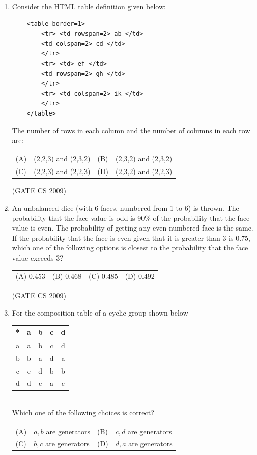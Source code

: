 \documentclass[a4paper, 11pt]{article}
\begin{document}
\begin{enumerate}
    \item Consider the HTML table definition given below:
    \begin{lstlisting}
    <table border=1>
        <tr> <td rowspan=2> ab </td>
        <td colspan=2> cd </td>
        </tr>
        <tr> <td> ef </td>
        <td rowspan=2> gh </td>
        </tr>
        <tr> <td colspan=2> ik </td>
        </tr>
    </table>
    \end{lstlisting}
    The number of rows in each column and the number of columns in each row are:\\
    \begin{tabularx}{\textwidth}{@{}lX lX@{}}
    (A) & (2,2,3) and (2,3,2)  & (B) & (2,3,2) and (2,3,2) \\
    (C) & (2,2,3) and (2,2,3) & (D) & (2,3,2) and (2,2,3)
    \end{tabularx}    

    \hfill (GATE CS 2009)

    \item An unbalanced dice (with 6 faces, numbered from 1 to 6) is thrown. The probability that the face value is odd is 90\% of the probability that the face value is even. The probability of getting any even numbered face is the same.\\
    If the probability that the face is even given that it is greater than 3 is 0.75, which one of the following options is closest to the probability that the face value exceeds 3?\\
    \begin{tabularx}{\textwidth}{@{}XXXX@{}}
    (A) 0.453 & (B) 0.468 & (C) 0.485 & (D) 0.492
    \end{tabularx}

    \hfill (GATE CS 2009)

    \item  For the composition table of a cyclic group shown below\\
    \begin{tabular}{c|cccc}
        * &a &b &c &d \\
        \hline
        a &a &b &c &d \\
        b &b &a &d &a \\
        c &c &d &b &b \\
        d &d &c &a &c \\
        
    \end{tabular}\\
    Which one of the following choices is correct?\\
    \begin{tabularx}{\textwidth}{@{}lX lX@{}}
    (A) & $a, b$ are generators  & (B) & $c, d$ are generators \\
    (C) & $b, c$ are generators & (D) & $d, a$ are generators
    \end{tabularx}  


\end{enumerate}
\end{document}
